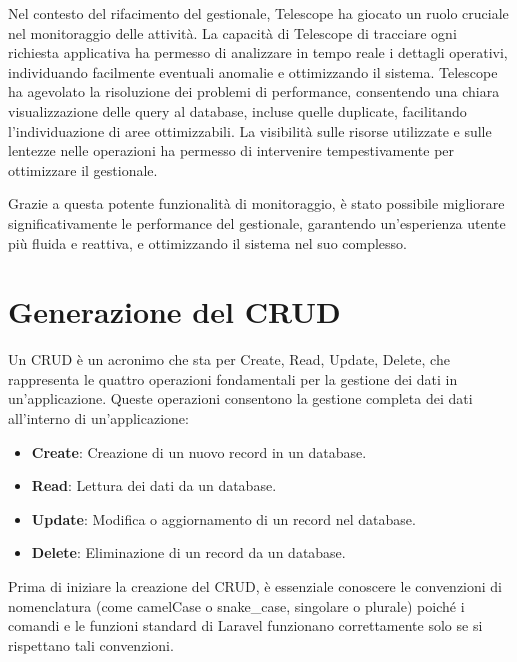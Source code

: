 Nel contesto del rifacimento del gestionale, Telescope ha giocato un ruolo cruciale nel monitoraggio delle attività. La capacità di Telescope di tracciare ogni richiesta applicativa ha permesso di analizzare in tempo reale i dettagli operativi, individuando facilmente eventuali anomalie e ottimizzando il sistema. Telescope ha agevolato la risoluzione dei problemi di performance, consentendo una chiara visualizzazione delle query al database, incluse quelle duplicate, facilitando l'individuazione di aree ottimizzabili. La visibilità sulle risorse utilizzate e sulle lentezze nelle operazioni ha permesso di intervenire tempestivamente per ottimizzare il gestionale.

Grazie a questa potente funzionalità di monitoraggio, è stato possibile migliorare significativamente le performance del gestionale, garantendo un'esperienza utente più fluida e reattiva, e ottimizzando il sistema nel suo complesso.
\section{Generazione del CRUD}\label{sec:cap_sec_subsec_crud}
Un CRUD è un acronimo che sta per Create, Read, Update, Delete, che rappresenta le quattro operazioni fondamentali per la gestione dei dati in un'applicazione. Queste operazioni consentono la gestione completa dei dati all'interno di un'applicazione:
\begin{itemize}
    \item \textbf{Create}: Creazione di un nuovo record in un database.
    \item \textbf{Read}: Lettura dei dati da un database.
    \item \textbf{Update}: Modifica o aggiornamento di un record nel database.
    \item \textbf{Delete}: Eliminazione di un record da un database.
\end{itemize}
Prima di iniziare la creazione del CRUD, è essenziale conoscere le convenzioni di nomenclatura (come camelCase o snake\_case, singolare o plurale) poiché i comandi e le funzioni standard di Laravel funzionano correttamente solo se si rispettano tali convenzioni.

